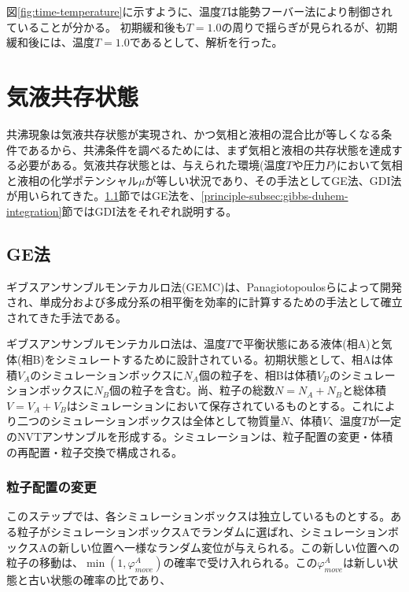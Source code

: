 \documentclass[titlepage]{jsreport}
\begin{document}
\newpage
図\ref{fig:time-temperature}に示すように、温度$T$は能勢フーバー法により制御されていることが分かる。
初期緩和後も$T=1.0$の周りで揺らぎが見られるが、初期緩和後には、温度$T=1.0$であるとして、解析を行った。


\section{気液共存状態} \label{principle-sec:gas-liquid-coexistence}
共沸現象は気液共存状態が実現され、かつ気相と液相の混合比が等しくなる条件であるから、共沸条件を調べるためには、まず気相と液相の共存状態を達成する必要がある。気液共存状態とは、与えられた環境(温度$T$や圧力$P$)において気相と液相の化学ポテンシャル$\mu$が等しい状況であり、その手法としてGE法、GDI法が用いられてきた。\ref{principle-subsec:gibbs-ensemble}節ではGE法を、\ref{principle-subsec:gibbs-duhem-integration}節ではGDI法をそれぞれ説明する。

\subsection{GE法} \label{principle-subsec:gibbs-ensemble}
ギブスアンサンブルモンテカルロ法(GEMC)は、Panagiotopoulosらによって開発され\cite{gibbs-ensemble-panagiotopoulos-1,gibbs-ensemble-panagiotopoulos-2}、単成分および多成分系の相平衡を効率的に計算するための手法として確立されてきた手法である\cite{gibbs-ensemble-phase-equilibrium-1,gibbs-ensemble-phase-equilibrium-2}。

ギブスアンサンブルモンテカルロ法は、温度$T$で平衡状態にある液体(相A)と気体(相B)をシミュレートするために設計されている\cite{gibbs-ensemble-panagiotopoulos-2}。初期状態として、相Aは体積$V_A$のシミュレーションボックスに$N_A$個の粒子を、相Bは体積$V_B$のシミュレーションボックスに$N_B$個の粒子を含む。尚、粒子の総数$N=N_A+N_B$と総体積$V=V_A+V_B$はシミュレーションにおいて保存されているものとする。これにより二つのシミュレーションボックスは全体として物質量$N$、体積$V$、温度$T$が一定のNVTアンサンブルを形成する。シミュレーションは、粒子配置の変更・体積の再配置・粒子交換で構成される。

\subsubsection{粒子配置の変更}\label{principle-subsubsec:particle-displacement}
このステップでは、各シミュレーションボックスは独立しているものとする。ある粒子がシミュレーションボックスAでランダムに選ばれ、シミュレーションボックスAの新しい位置へ一様なランダム変位が与えられる。この新しい位置への粒子の移動は、$\min(1, \varphi_{move}^A)$の確率で受け入れられる。この$\varphi_{move}^A$は新しい状態と古い状態の確率の比であり、
\end{document}
